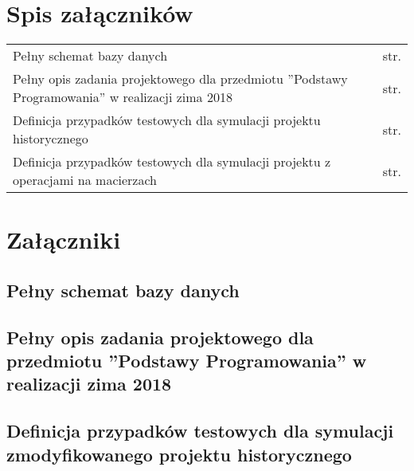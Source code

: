 \chapter*{Spis załączników}
\noindent

\begin{tabularx}{\textwidth}{Xl}

    Pełny schemat bazy danych & str. \pageref{file:database-schema} \\

    Pełny opis zadania projektowego dla przedmiotu ”Podstawy Programowania” w realizacji zima 2018 & str. \pageref{file:penguins_description} \\

    Definicja przypadków testowych dla symulacji projektu historycznego & str. \pageref{file:test_cases_penguins} \\

    Definicja przypadków testowych dla symulacji projektu z operacjami na macierzach & str. \pageref{file:test_cases_matrix} \\

\end{tabularx}

\chapter*{Załączniki}

\section*{Pełny schemat bazy danych}
\label{file:database-schema}
{
\tiny

}

\section*{Pełny opis zadania projektowego dla przedmiotu ”Podstawy Programowania” w realizacji zima 2018}
\label{file:penguins_description}
{

}


\section*{Definicja przypadków testowych dla symulacji zmodyfikowanego projektu historycznego}
\label{file:test_cases_penguins}

